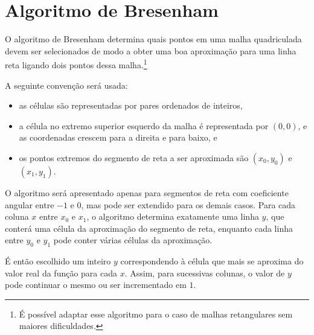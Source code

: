 %
%
%

\section{Algoritmo de Bresenham} \label{sse:bresenham_line}
O algoritmo de Bresenham determina quais pontos em uma malha quadriculada
devem ser selecionados de modo a obter uma boa aproximação
para uma linha reta ligando dois pontos dessa malha.\footnote{É possível adaptar
esse algoritmo para o caso de malhas retangulares sem maiores dificuldades.}

A seguinte convenção será usada:
\begin{itemize}
\item as células são representadas por pares ordenados de inteiros,
\item a célula no extremo superior esquerdo da malha é representada por
$(0,0)$, e as coordenadas crescem para a direita e para baixo, e
\item os pontos extremos do segmento de reta a ser aproximada são $(x_0,y_0)$
e  $(x_1,y_1)$.
\end{itemize}

O algoritmo será apresentado apenas para segmentos de reta com coeficiente
angular entre $-1$ e $0$, mas pode ser extendido para os demais casos. Para
cada coluna $x$ entre $x_0$ e $x_1$, o algoritmo determina exatamente uma linha
$y$, que conterá uma célula da aproximação do segmento de reta, enquanto cada
linha entre $y_0$ e $y_1$ pode conter várias células da aproximação.

É então escolhido um inteiro $y$ correspondendo à célula
que mais se aproxima do valor real da função para cada $x$. Assim, para
sucessivas colunas, o valor de $y$ pode continuar o mesmo ou ser incrementado
em $1$.

